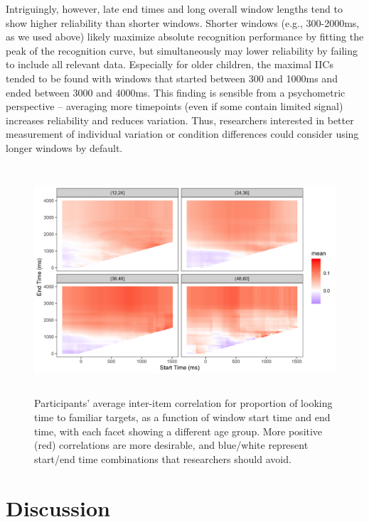 \documentclass[10pt, letterpaper]{article}
\begin{document}
Intriguingly, however, late end times and long overall window lengths
tend to show higher reliability than shorter windows. Shorter windows
(e.g., 300-2000ms, as we used above) likely maximize absolute
recognition performance by fitting the peak of the recognition curve,
but simultaneously may lower reliability by failing to include all
relevant data. Especially for older children, the maximal IICs tended to
be found with windows that started between 300 and 1000ms and ended
between 3000 and 4000ms. This finding is sensible from a psychometric
perspective -- averaging more timepoints (even if some contain limited
signal) increases reliability and reduces variation. Thus, researchers
interested in better measurement of individual variation or condition
differences could consider using longer windows by default.

\begin{figure} 
\includegraphics[width=13.6cm,height=8.5cm]{../figures/interitem_cors_window_analysis.png}
\caption{Participants' average inter-item correlation for proportion of looking time to familiar targets, as a function of window start time and end time, with each facet showing a different age group. More positive (red) correlations are more desirable, and blue/white represent start/end time combinations that researchers should avoid.}
\label{fig:time_window}
\end{figure}

\hypertarget{discussion}{%
\section{Discussion}\label{discussion}}
\end{document}
